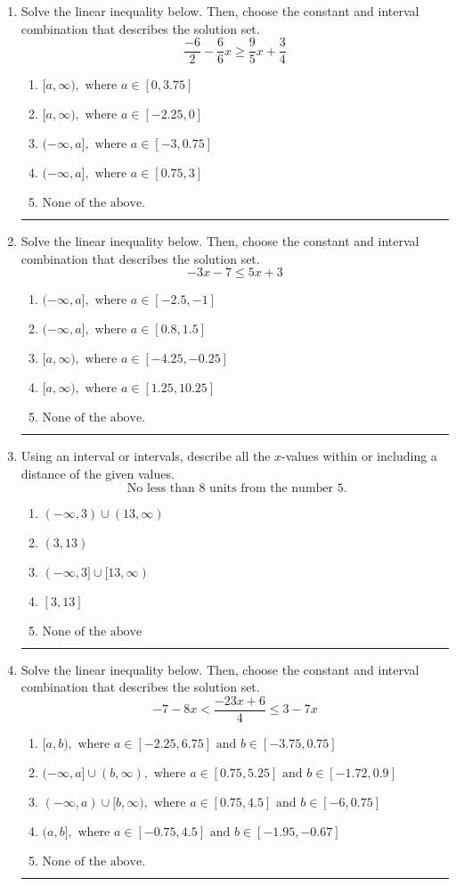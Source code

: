 \documentclass[14pt]{extbook}
\newcommand{\litem}[1]{\item#1\hspace*{-1cm}\rule{\textwidth}{0.4pt}}
\begin{document}
\begin{enumerate}
\litem{
Solve the linear inequality below. Then, choose the constant and interval combination that describes the solution set.\[ \frac{-6}{2} - \frac{6}{6} x \geq \frac{9}{5} x + \frac{3}{4} \]\begin{enumerate}[label=\Alph*.]
\item \( [a, \infty), \text{ where } a \in [0, 3.75] \)
\item \( [a, \infty), \text{ where } a \in [-2.25, 0] \)
\item \( (-\infty, a], \text{ where } a \in [-3, 0.75] \)
\item \( (-\infty, a], \text{ where } a \in [0.75, 3] \)
\item \( \text{None of the above}. \)

\end{enumerate} }
\litem{
Solve the linear inequality below. Then, choose the constant and interval combination that describes the solution set.\[ -3x -7 \leq 5x + 3 \]\begin{enumerate}[label=\Alph*.]
\item \( (-\infty, a], \text{ where } a \in [-2.5, -1] \)
\item \( (-\infty, a], \text{ where } a \in [0.8, 1.5] \)
\item \( [a, \infty), \text{ where } a \in [-4.25, -0.25] \)
\item \( [a, \infty), \text{ where } a \in [1.25, 10.25] \)
\item \( \text{None of the above}. \)

\end{enumerate} }
\litem{
Using an interval or intervals, describe all the $x$-values within or including a distance of the given values.\[ \text{ No less than } 8 \text{ units from the number } 5. \]\begin{enumerate}[label=\Alph*.]
\item \( (-\infty, 3) \cup (13, \infty) \)
\item \( (3, 13) \)
\item \( (-\infty, 3] \cup [13, \infty) \)
\item \( [3, 13] \)
\item \( \text{None of the above} \)

\end{enumerate} }
\litem{
Solve the linear inequality below. Then, choose the constant and interval combination that describes the solution set.\[ -7 - 8 x < \frac{-23 x + 6}{4} \leq 3 - 7 x \]\begin{enumerate}[label=\Alph*.]
\item \( [a, b), \text{ where } a \in [-2.25, 6.75] \text{ and } b \in [-3.75, 0.75] \)
\item \( (-\infty, a] \cup (b, \infty), \text{ where } a \in [0.75, 5.25] \text{ and } b \in [-1.72, 0.9] \)
\item \( (-\infty, a) \cup [b, \infty), \text{ where } a \in [0.75, 4.5] \text{ and } b \in [-6, 0.75] \)
\item \( (a, b], \text{ where } a \in [-0.75, 4.5] \text{ and } b \in [-1.95, -0.67] \)
\item \( \text{None of the above.} \)


\end{enumerate}}
\end{enumerate}
\end{document}

